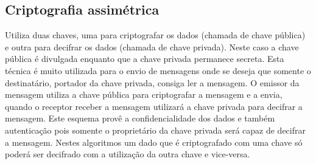 \subsection{Criptografia assimétrica}
Utiliza duas chaves, uma para criptografar os dados (chamada de chave pública) e outra para decifrar os dados (chamada de chave privada). Neste caso a chave pública é divulgada enquanto que a chave privada permanece secreta. Esta técnica é muito utilizada para o envio de mensagens onde se deseja que somente o destinatário, portador da chave privada, consiga ler a mensagem. O emissor da mensagem utiliza a chave pública para criptografar a mensagem e a envia, quando o receptor receber a mensagem utilizará a chave privada para decifrar a mensagem. Este esquema provê a confidencialidade dos dados e também autenticação pois somente o proprietário da chave privada será capaz de decifrar a mensagem. Nestes algoritmos um dado que é criptografado com uma chave só poderá ser decifrado com a utilização da outra chave e vice-versa.
